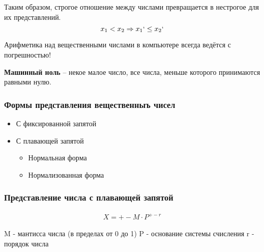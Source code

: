 Таким образом, строгое отношение между числами превращается в нестрогое для их представлений. \[
x_1 < x_2 \implies x_1` \le x_2`
\] 

\begin{note}
  Арифметика над вещественными числами в компьютере всегда ведётся с погрешностью! 
\end{note}

\begin{definition}
  \textbf{Машинный ноль} -- некое малое число, все числа, меньше которого принимаются равными нулю.
\end{definition}

\subsubsection{Формы представления вещественныъ чисел}

\begin{itemize}
  \item С фиксированной запятой
  \item С плавающей запятой
    \begin{itemize}
      \item Нормальная форма
      \item Нормализованная форма
    \end{itemize}
\end{itemize}

\subsubsection*{Представление числа с плавающей запятой}

\begin{gather*}
  X = +- M \cdot P^{+-r}
\end{gather*}

M - мантисса числа (в пределах от 0 до 1)
P - основание системы счисления
r - порядок числа

